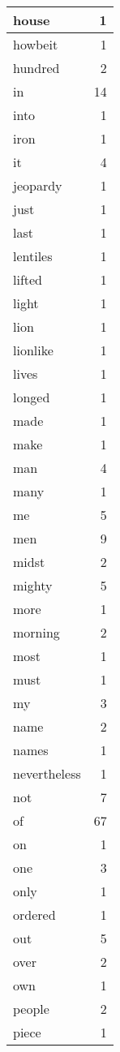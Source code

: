 \begin{center}
\begin{longtable}{l|r}
house & 1 \\ \hline
howbeit & 1 \\ \hline
hundred & 2 \\ \hline
in & 14 \\ \hline
into & 1 \\ \hline
iron & 1 \\ \hline
it & 4 \\ \hline
jeopardy & 1 \\ \hline
just & 1 \\ \hline
last & 1 \\ \hline
lentiles & 1 \\ \hline
lifted & 1 \\ \hline
light & 1 \\ \hline
lion & 1 \\ \hline
lionlike & 1 \\ \hline
lives & 1 \\ \hline
longed & 1 \\ \hline
made & 1 \\ \hline
make & 1 \\ \hline
man & 4 \\ \hline
many & 1 \\ \hline
me & 5 \\ \hline
men & 9 \\ \hline
midst & 2 \\ \hline
mighty & 5 \\ \hline
more & 1 \\ \hline
morning & 2 \\ \hline
most & 1 \\ \hline
must & 1 \\ \hline
my & 3 \\ \hline
name & 2 \\ \hline
names & 1 \\ \hline
nevertheless & 1 \\ \hline
not & 7 \\ \hline
of & 67 \\ \hline
on & 1 \\ \hline
one & 3 \\ \hline
only & 1 \\ \hline
ordered & 1 \\ \hline
out & 5 \\ \hline
over & 2 \\ \hline
own & 1 \\ \hline
people & 2 \\ \hline
piece & 1 \\ \hline

\end{longtable}
\end{center}
